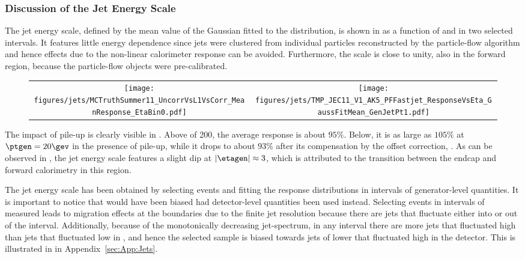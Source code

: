 \subsubsection{Discussion of the Jet Energy Scale} \label{sec:Jets:JEC:Response:JetEnergyScale}
The jet energy scale, defined by the mean value of the Gaussian fitted to the \resp distribution, is shown in  as a function of \ptgen and \etagen in two selected intervals.
It features little energy dependence since jets were clustered from individual particles reconstructed by the particle-flow algorithm and hence effects due to the non-linear calorimeter response can be avoided.
Furthermore, the scale is close to unity, also in the forward region, because the particle-flow objects were pre-calibrated.
\begin{figure}[!ht]
  \centering
  \begin{tabular}{cc}
    \texttt{[image: figures/jets/MCTruthSummer11\_UncorrVsL1VsCorr\_MeanResponse\_EtaBin0.pdf]} &
    \texttt{[image: figures/jets/TMP\_JEC11\_V1\_AK5\_PFFastjet\_ResponseVsEta\_GaussFitMean\_GenJetPt1.pdf]} \\
  \end{tabular}
  \caption{}
  \label{fig:Jets:Response:MCJES}
\end{figure}  

The impact of pile-up is clearly visible in .
Above \ptgen of 200\gev, the average response is about $95\%$.
Below, it is as large as $105\%$ at \mbox{$\ptgen = 20\gev$} in the presence of pile-up, while it drops to about $93\%$ after its compensation by the offset correction, \cf {}.
As can be observed in , the jet energy scale features a slight dip at \mbox{$|\etagen| \approx 3$}, which is attributed to the transition between the endcap and forward calorimetry in this region.

The jet energy scale has been obtained by selecting events and fitting the response distributions in intervals of generator-level quantities.
It is important to notice that \resp would have been biased had detector-level quantities been used instead.
Selecting events in intervals of measured \pt leads to migration effects at the boundaries due to the finite jet \pt resolution because there are jets that fluctuate either into or out of the interval.
Additionally, because of the monotonically decreasing jet-\pt spectrum, in any interval there are more jets that fluctuated high than jets that fluctuated low in \pt, and hence the selected sample is biased towards jets of lower \ptgen that fluctuated high in the detector.
This is illustrated in  in Appendix~\ref{sec:App:Jets}.

